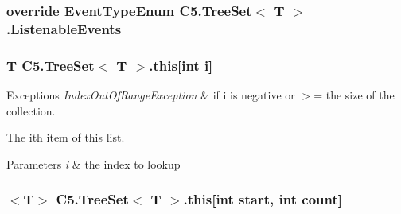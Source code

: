 \subsubsection[{Listenable\+Events}]{\setlength{\rightskip}{0pt plus 5cm}override {\bf Event\+Type\+Enum} {\bf C5.\+Tree\+Set}$<$ T $>$.Listenable\+Events\hspace{0.3cm}{\ttfamily [get]}}\label{class_c5_1_1_tree_set_aebb5b753eabbe0bae5a02e7d3559b4c9}




\hypertarget{class_c5_1_1_tree_set_a86dcea1de135e2f495922fffd43ee53f}{}
\subsubsection[{this[int i]}]{\setlength{\rightskip}{0pt plus 5cm}T {\bf C5.\+Tree\+Set}$<$ T $>$.this\mbox{[}int i\mbox{]}\hspace{0.3cm}{\ttfamily [get]}}\label{class_c5_1_1_tree_set_a86dcea1de135e2f495922fffd43ee53f}



\begin{DoxyExceptions}{Exceptions}
{\em Index\+Out\+Of\+Range\+Exception} & if i is negative or $>$= the size of the collection. \\
\hline
\end{DoxyExceptions}


The i\textquotesingle{}th item of this list.


\begin{DoxyParams}{Parameters}
{\em i} & the index to lookup\\
\hline
\end{DoxyParams}
\hypertarget{class_c5_1_1_tree_set_a8f145718895321cbd015c6c42de4e708}{}
\subsubsection[{this[int start, int count]}]{$<$T$>$ {\bf C5.\+Tree\+Set}$<$ T $>$.this\mbox{[}int start, int count\mbox{]}\hspace{0.3cm}{\ttfamily [get]}}\label{class_c5_1_1_tree_set_a8f145718895321cbd015c6c42de4e708}



